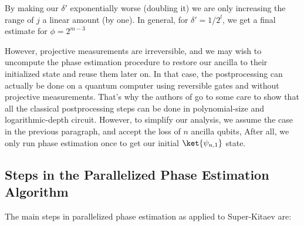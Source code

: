 By making our $\delta'$
exponentially worse (doubling it) we are only increasing the range of
$j$ a linear amount (by one). In general, for $\delta'=1/2^l$, we get
a final estimate for $\phi = 2^{m-3}$

However, projective measurements are irreversible, and we may wish to
uncompute the phase estimation procedure to restore our ancilla to
their initialized state and reuse them later on. In that case, the
postprocessing can actually be done on a quantum computer using
reversible gates and without projective measurements. That's why
the authors of \cite{ksv02} go to some care to show that all the classical
postprocessing steps can be done in polynomial-size and logarithmic-depth
circuit.
However, to simplify our analysis, we assume the case
in the previous paragraph, and accept the
loss of $n$ ancilla qubits, After all, we only run phase estimation once
to get our initial $\ket{\psi_{n,1}}$ state.

\subsection{Steps in the Parallelized Phase Estimation Algorithm}

The main steps in parallelized phase estimation as applied to Super-Kitaev
are:

